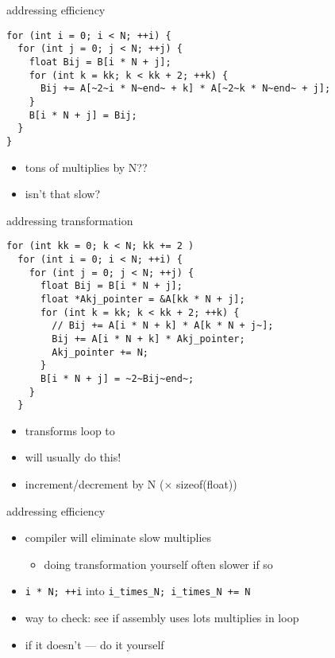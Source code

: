 \begin{frame}[fragile,label=addrEff]{addressing efficiency}
    \vspace{-.25cm}
\begin{lstlisting}
for (int i = 0; i < N; ++i) {
  for (int j = 0; j < N; ++j) {
    float Bij = B[i * N + j];
    for (int k = kk; k < kk + 2; ++k) {
      Bij += A[~2~i * N~end~ + k] * A[~2~k * N~end~ + j];
    }
    B[i * N + j] = Bij;
  }
}
\end{lstlisting}
\begin{itemize}
    \item tons of multiplies by N??
    \item isn't that slow?
\end{itemize}
\end{frame}

\begin{frame}[fragile,label=addrXform]{addressing transformation}
    \vspace{-.25cm}
\begin{lstlisting}
for (int kk = 0; k < N; kk += 2 )
  for (int i = 0; i < N; ++i) {
    for (int j = 0; j < N; ++j) {
      float Bij = B[i * N + j];
      float *Akj_pointer = &A[kk * N + j];
      for (int k = kk; k < kk + 2; ++k) {
        // Bij += A[i * N + k] * A[k * N + j~];
        Bij += A[i * N + k] * Akj_pointer;
        Akj_pointer += N;
      }
      B[i * N + j] = ~2~Bij~end~;
    }
  }
\end{lstlisting}
\begin{itemize}
    \item transforms loop to 
    \item {} will usually do this!
    \item increment/decrement by N ($\times$ sizeof(float))
\end{itemize}
\end{frame}

\begin{frame}[fragile,label=addressEff]{addressing efficiency}
    \begin{itemize}
        \item compiler will  eliminate slow multiplies
            \begin{itemize}
            \item doing transformation yourself often slower if so
            \end{itemize}
        \item \lstinline|i * N; ++i| into \lstinline|i_times_N; i_times_N += N|
        \item way to check: see if assembly uses lots multiplies in loop
        \item if it doesn't --- do it yourself
    \end{itemize}
\end{frame}

